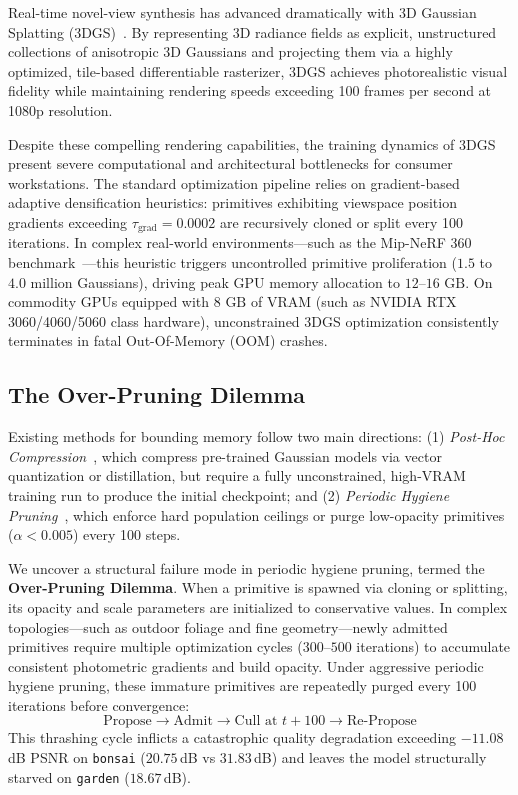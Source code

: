 \documentclass[10pt,twocolumn,letterpaper]{article}
\begin{document}
Real-time novel-view synthesis has advanced dramatically with 3D Gaussian Splatting (3DGS)~\cite{kerbl20233d}. By representing 3D radiance fields as explicit, unstructured collections of anisotropic 3D Gaussians and projecting them via a highly optimized, tile-based differentiable rasterizer, 3DGS achieves photorealistic visual fidelity while maintaining rendering speeds exceeding 100 frames per second at 1080p resolution.

Despite these compelling rendering capabilities, the training dynamics of 3DGS present severe computational and architectural bottlenecks for consumer workstations. The standard optimization pipeline relies on gradient-based adaptive densification heuristics: primitives exhibiting viewspace position gradients exceeding $\tau_{\text{grad}} = 0.0002$ are recursively cloned or split every 100 iterations. In complex real-world environments—such as the Mip-NeRF 360 benchmark~\cite{barron2022mipnerf360}—this heuristic triggers uncontrolled primitive proliferation ($1.5$ to $4.0\text{ million}$ Gaussians), driving peak GPU memory allocation to $12\text{--}16\text{ GB}$. On commodity GPUs equipped with $8\text{ GB}$ of VRAM (such as NVIDIA RTX 3060/4060/5060 class hardware), unconstrained 3DGS optimization consistently terminates in fatal Out-Of-Memory (OOM) crashes.

\subsection{The Over-Pruning Dilemma}

Existing methods for bounding memory follow two main directions:
(1) \textit{Post-Hoc Compression}~\cite{fan2024lightgaussian,lee2024compact3dgs,girish2024eagles}, which compress pre-trained Gaussian models via vector quantization or distillation, but require a fully unconstrained, high-VRAM training run to produce the initial checkpoint; and
(2) \textit{Periodic Hygiene Pruning}~\cite{fang2024mini,lu2024scaffoldgs}, which enforce hard population ceilings or purge low-opacity primitives ($\alpha < 0.005$) every 100 steps.

We uncover a structural failure mode in periodic hygiene pruning, termed the \textbf{Over-Pruning Dilemma}. When a primitive is spawned via cloning or splitting, its opacity and scale parameters are initialized to conservative values. In complex topologies—such as outdoor foliage and fine geometry—newly admitted primitives require multiple optimization cycles ($300\text{--}500$ iterations) to accumulate consistent photometric gradients and build opacity. Under aggressive periodic hygiene pruning, these immature primitives are repeatedly purged every 100 iterations before convergence:
\begin{equation}
\text{Propose} \longrightarrow \text{Admit} \longrightarrow \text{Cull at } t+100 \longrightarrow \text{Re-Propose}
\end{equation}
This thrashing cycle inflicts a catastrophic quality degradation exceeding $-11.08$\,dB PSNR on \texttt{bonsai} ($20.75$\,dB vs $31.83$\,dB) and leaves the model structurally starved on \texttt{garden} ($18.67$\,dB).
\end{document}
